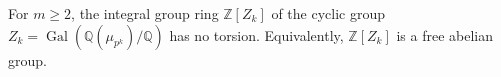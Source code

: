 For $m \geq 2$, the integral group ring $\mathbb{Z}[Z_k]$ of the cyclic group $Z_k = \operatorname{Gal}(\mathbb{Q}(\mu_{p^k})/\mathbb{Q})$ has no torsion. Equivalently, $\mathbb{Z}[Z_k]$ is a free abelian group.

